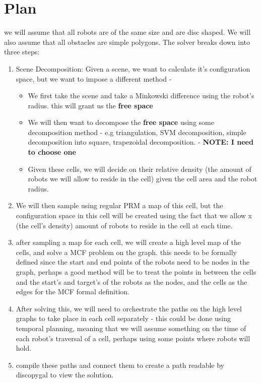 \section*{Plan}
we will assume that all robots are of the same size and are disc shaped. We will also assume that all obstacles are simple polygons.
\noindent The solver breaks down into three steps:
\begin{enumerate}
    \item Scene Decomposition: Given a scene, we want to calculate it's configuration space, but we want to impose a different method -
    \begin{itemize}
        \item We first take the scene and take a Minkowski difference using the robot's radius. this will grant us the \textbf{free space}
        \item We will then want to decompose the \textbf{free space} using some decomposition method - e.g triangulation, SVM decomposition, simple decomposition into square, trapezoidal decomposition. - \textbf{NOTE: I need to choose one}
        \item Given these cells, we will decide on their relative density (the amount of robots we will allow to reside in the cell) given the cell area and the robot radius.
    \end{itemize}
    \item We will then sample using regular PRM a map of this cell, but the configuration space in this cell will be created using the fact that we allow x (the cell's density) amount of robots to reside in the cell at each time.
    \item after sampling a map for each cell, we will create a high level map of the cells, and solve a MCF problem on the graph. this needs to be formally defined since the start and end points of the robots need to be nodes in the graph, perhaps a good method will be to treat the points in between the cells and the start's and target's of the robots as the nodes, and the cells as the edges for the MCF formal definition.
    \item After solving this, we will need to orchestrate the paths on the high level graphs to take place in each cell separately - this could be done using temporal planning, meaning that we will assume something on the time of each robot's traversal of a cell, perhaps using some points where robots will hold.
    \item compile these paths and connect them to create a path readable by discopygal to view the solution.
\end{enumerate}